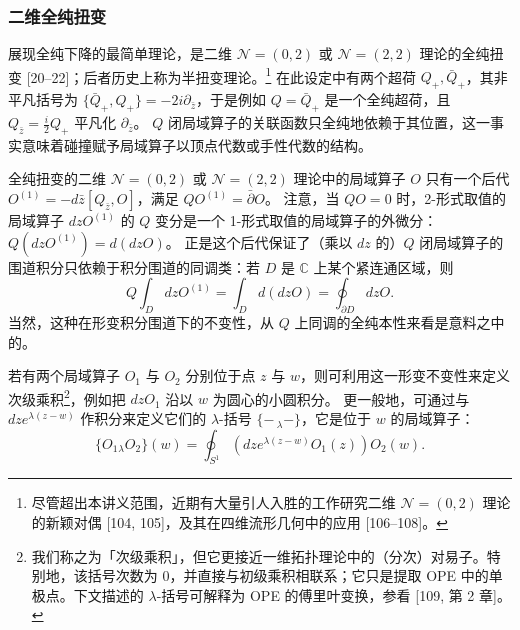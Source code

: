 \subsubsection{二维全纯扭变}

展现全纯下降的最简单理论，是二维 $\mathcal{N}=(0,2)$ 或 $\mathcal{N}=(2,2)$ 理论的全纯扭变 [20--22]；后者历史上称为半扭变理论。\footnote{尽管超出本讲义范围，近期有大量引人入胜的工作研究二维 $\mathcal{N}=(0,2)$ 理论的新颖对偶 [104, 105]，及其在四维流形几何中的应用 [106--108]。}
在此设定中有两个超荷 $Q_+,\bar Q_+$，其非平凡括号为 $\{\bar Q_+,Q_+\}=-2i\partial_{\bar z}$，于是例如 $Q=\bar Q_+$ 是一个全纯超荷，且 $Q_{\bar z}=\frac{i}{2}Q_+$ 平凡化 $\partial_{\bar z}$。
$Q$ 闭局域算子的关联函数只全纯地依赖于其位置，这一事实意味着碰撞赋予局域算子以顶点代数或手性代数的结构。

全纯扭变的二维 $\mathcal{N}=(0,2)$ 或 $\mathcal{N}=(2,2)$ 理论中的局域算子 $O$ 只有一个后代 $O^{(1)}=-d\bar z[Q_{\bar z},O]$，满足 $QO^{(1)}=\bar\partial O$。
注意，当 $QO=0$ 时，2-形式取值的局域算子 $dzO^{(1)}$ 的 $Q$ 变分是一个 1-形式取值的局域算子的外微分：$Q(dzO^{(1)})=d(dzO)$。
正是这个后代保证了（乘以 $dz$ 的）$Q$ 闭局域算子的围道积分只依赖于积分围道的同调类：若 $D$ 是 $\mathbb{C}$ 上某个紧连通区域，则
\begin{equation}\tag{3.62}
Q\int_D dzO^{(1)}=\int_D d(dzO)=\oint_{\partial D}dzO.
\end{equation}
当然，这种在形变积分围道下的不变性，从 $Q$ 上同调的全纯本性来看是意料之中的。

若有两个局域算子 $O_1$ 与 $O_2$ 分别位于点 $z$ 与 $w$，则可利用这一形变不变性来定义次级乘积\footnote{我们称之为「次级乘积」，但它更接近一维拓扑理论中的（分次）对易子。特别地，该括号次数为 $0$，并直接与初级乘积相联系；它只是提取 OPE 中的单极点。下文描述的 $\lambda$-括号可解释为 OPE 的傅里叶变换，参看 [109, 第 2 章]。}，例如把 $dzO_1$ 沿以 $w$ 为圆心的小圆积分。
更一般地，可通过与 $dze^{\lambda(z-w)}$ 作积分来定义它们的 $\lambda$-括号 $\{-\,_\lambda-\}$，它是位于 $w$ 的局域算子：
\begin{equation}\tag{3.63}
\{O_1{}_\lambda O_2\}(w)=\oint_{S^1}(dze^{\lambda(z-w)}O_1(z))O_2(w).
\end{equation}

